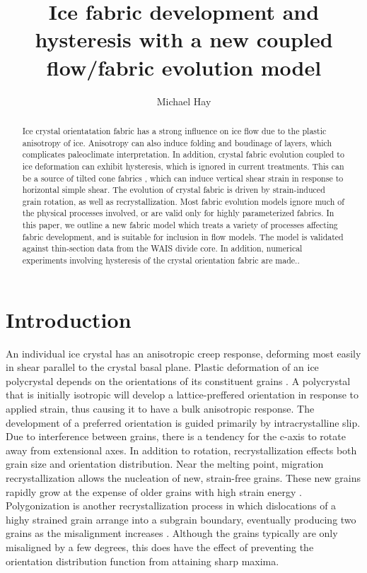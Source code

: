 \documentclass{article}
\title{Ice fabric development and hysteresis with a new coupled flow/fabric evolution model}
\author{Michael Hay}
\begin{document}
\maketitle

\begin{abstract}
Ice crystal orientatation fabric has a strong influence on ice flow due to the plastic anisotropy of ice. Anisotropy can also induce folding and boudinage of layers, which complicates paleoclimate interpretation. In addition, crystal fabric evolution coupled to ice deformation can exhibit hysteresis, which is ignored in current treatments. This can be a source of tilted cone fabrics \citep{throstur2002}, which can induce vertical shear strain in response to horizontal simple shear. The evolution of crystal fabric is driven by strain-induced grain rotation, as well as recrystallization. Most fabric evolution models ignore much of the physical processes involved, or are valid only for highly parameterized fabrics. In this paper, we outline a new fabric model which treats a variety of processes affecting fabric development, and is suitable for inclusion in flow models. The model is validated against thin-section data from the WAIS divide core. In addition, numerical experiments involving hysteresis of the crystal orientation fabric are made.. 
\end{abstract}

\section{Introduction}
An individual ice crystal has an anisotropic creep response, deforming most easily in shear parallel to the crystal basal plane. Plastic deformation of an ice polycrystal depends on the orientations of its constituent grains \citep{azuma94}. A polycrystal that is initially isotropic will develop a lattice-preffered orientation in response to applied strain, thus causing it to have a bulk anisotropic response. The development of a preferred orientation is guided primarily by intracrystalline slip. Due to interference between grains, there is a tendency for the c-axis to rotate away from extensional axes. In addition to rotation, recrystallization effects both grain size and orientation distribution. Near the melting point, migration recrystallization allows the nucleation of new, strain-free grains. These new grains rapidly grow at the expense of older grains with high strain energy \citep{duval1995}. Polygonization is another recrystallization process in which dislocations of a highy strained grain arrange into a subgrain boundary, eventually producing two grains as the misalignment increases \citep{alley96}. Although the grains typically are only misaligned by a few degrees, this does have the effect of preventing the orientation distribution function from attaining sharp maxima.
\end{document}
